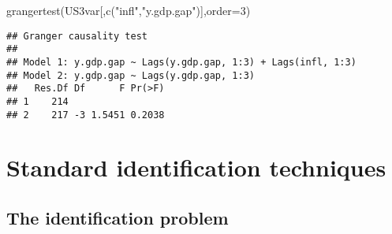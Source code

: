 \documentclass[
  12pt,
]{book}
\newenvironment{Shaded}{\begin{snugshade}}{\end{snugshade}}
\newcommand{\AttributeTok}[1]{\textcolor[rgb]{0.77,0.63,0.00}{#1}}
\newcommand{\DecValTok}[1]{\textcolor[rgb]{0.00,0.00,0.81}{#1}}
\newcommand{\FunctionTok}[1]{\textcolor[rgb]{0.00,0.00,0.00}{#1}}
\newcommand{\NormalTok}[1]{#1}
\newcommand{\StringTok}[1]{\textcolor[rgb]{0.31,0.60,0.02}{#1}}
\theoremstyle{definition}
\theoremstyle{definition}
\theoremstyle{definition}
\theoremstyle{definition}
\theoremstyle{remark}
\begin{document}
\begin{Shaded}
\begin{Highlighting}[]
\FunctionTok{grangertest}\NormalTok{(US3var[,}\FunctionTok{c}\NormalTok{(}\StringTok{"infl"}\NormalTok{,}\StringTok{"y.gdp.gap"}\NormalTok{)],}\AttributeTok{order=}\DecValTok{3}\NormalTok{)}
\end{Highlighting}
\end{Shaded}

\begin{verbatim}
## Granger causality test
## 
## Model 1: y.gdp.gap ~ Lags(y.gdp.gap, 1:3) + Lags(infl, 1:3)
## Model 2: y.gdp.gap ~ Lags(y.gdp.gap, 1:3)
##   Res.Df Df      F Pr(>F)
## 1    214                 
## 2    217 -3 1.5451 0.2038
\end{verbatim}

\hypertarget{identifStruct}{%
\section{Standard identification techniques}\label{identifStruct}}

\hypertarget{IdentifPbm}{%
\subsection{The identification problem}\label{IdentifPbm}}
\end{document}
